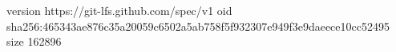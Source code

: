version https://git-lfs.github.com/spec/v1
oid sha256:465343ae876c35a20059c6502a5ab758f5f932307e949f3e9daeece10cc52495
size 162896
